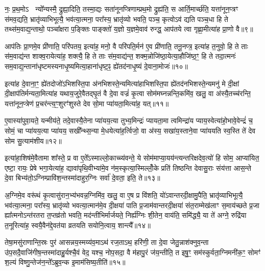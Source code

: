 नः॒ प्र॒थ॒मो\-ऽ  न्यो᳚न्यस्मै॒ द्रुह्या॒दिति॒ तस्मा॒द्यः सता॑नूनप्त्रिणाम्प्रथ॒मो द्रुह्य॑ति॒ स आर्ति॒मार्च्छ॑ति॒ यत्ता॑नून॒प्त्रꣳ स॑मव॒द्यति॒ भ्रातृ॑व्याभिभूत्यै॒ भव॑त्या॒त्मना॒ परा᳚स्य॒ भ्रातृ॑व्यो भवति॒ पञ्च॒ कृत्वो\-ऽव॑ द्यति पञ्च॒धा हि ते तथ्स॑म॒वाद्य॒न्ताथो॒ पञ्चा᳚क्षरा प॒ङ्क्तिः पाङ्क्तो॑ य॒ज्ञो य॒ज्ञमे॒वाव॑ रुन्द्ध॒ आप॑तये त्वा गृह्णा॒मीत्या॑ह प्रा॒णो वै॥९॥

आप॑तिः प्रा॒णमे॒व प्री॑णाति॒ परि॑पतय॒ इत्या॑ह॒ मनो॒ वै परि॑पति॒र्मन॑ ए॒व प्री॑णाति॒ तनू॒नप्त्र॒ इत्या॑ह त॒नुवो॒ हि ते ताः स॑म॒वाद्य॑न्त शाक्व॒रायेत्या॑ह॒ शक्त्यै॒ हि ते ताः स॑म॒वाद्य॑न्त॒ शक्म॒न्नोजि॑ष्ठा॒येत्या॒हौजि॑ष्ठ॒ꣳ॒ हि ते तदा॒त्मनः॑ सम॒वाद्य॒न्ताना॑धृष्टमस्यनाधृ॒ष्यमित्या॒हाना॑धृष्ट॒ꣴ॒ ह्ये॑तद॑नाधृ॒ष्यं दे॒वाना॒मोजः॑॥१०॥

इत्या॑ह दे॒वाना॒ꣳ॒ ह्ये॑तदोजो॑\-ऽभिशस्ति॒पा अ॑नभिशस्ते॒न्यमित्या॑हाभिशस्ति॒पा ह्ये॑तद॑नभिशस्ते॒न्यमनु॑ मे दी॒क्षां दी॒क्षाप॑तिर्मन्यता॒मित्या॑ह यथाय॒जुरे॒वैतद्घृ॒तं वै दे॒वा वज्रं॑ कृ॒त्वा सोम॑मघ्नन्नन्ति॒कमि॑व॒ खलु॒ वा अ॑स्यै॒तच्च॑रन्ति॒ यत्ता॑नून॒प्त्रेण॑ प्र॒चर॑न्त्य॒ꣳ॒शुरꣳ॑शुस्ते देव सो॒मा प्या॑यता॒मित्या॑ह॒ यत्॥११॥

ए॒वास्या॑पुवा॒यते॒ यन्मीय॑ते॒ तदे॒वास्यै॒तेना प्या॑यय॒त्या तुभ्य॒मिन्द्रः॑ प्यायता॒मा त्वमिन्द्रा॑य प्याय॒स्वेत्या॑हो॒भावे॒वेन्द्रं॑ च॒ सोमं॒ चा प्या॑यय॒त्या प्या॑यय॒ सखी᳚न्थ्स॒न्या मे॒धयेत्या॑ह॒र्त्विजो॒ वा अ॑स्य॒ सखा॑य॒स्ताने॒वा प्या॑ययति स्व॒स्ति ते॑ देव सोम सु॒त्याम॑शीय॥१२॥

इत्या॑हा॒शिष॑मे॒वैतामा शा᳚स्ते॒ प्र वा ए॒ते᳚\-ऽस्माल्लो॒काच्च्य॑वन्ते॒ ये सोम॑माप्या॒यय॑न्त्यन्तरिक्षदेव॒त्यो॑ हि सोम॒ आप्या॑यित॒ एष्टा॒ रायः॒ प्रेषे भगा॒येत्या॑ह॒ द्यावा॑पृथि॒वीभ्या॑मे॒व न॑म॒स्कृत्या॒स्मिल्लोँ॒के प्रति॑ तिष्ठन्ति देवासु॒राः संय॑त्ता आस॒न्ते दे॒वा बिभ्य॑तो॒\-ऽग्निम्प्रावि॑श॒न्तस्मा॑दाहुर॒ग्निः सर्वा॑ दे॒वता॒ इति॒ ते॥१३॥

अ॒ग्निमे॒व वरू॑थं कृ॒त्वासु॑रान॒भ्य॑भवन्न॒ग्निमि॑व॒ खलु॒ वा ए॒ष प्र वि॑शति॒ यो॑\-ऽवान्तरदी॒क्षामु॒पैति॒ भ्रातृ॑व्याभिभूत्यै॒ भव॑त्या॒त्मना॒ परा᳚स्य॒ भ्रातृ॑व्यो भवत्या॒त्मान॑मे॒व दी॒क्षया॑ पाति प्र॒जाम॑वान्तरदी॒क्षया॑ संत॒राम्मेख॑लाꣳ स॒माय॑च्छते प्र॒जा ह्या᳚त्मनो\-ऽन्त॑रतरा त॒प्तव्र॑तो भवति॒ मद॑न्तीभिर्मार्जयते॒ निर्\mbox{}ह्य॑ग्निः शी॒तेन॒ वाय॑ति॒ समि॑द्ध्यै॒ या ते॑ अग्ने॒ रुद्रि॑या त॒नूरित्या॑ह॒ स्वयै॒वैन॑द्दे॒वत॑या व्रतयति सयोनि॒त्वाय॒ शान्त्यै᳚॥१४॥

{\anuvakamend[{यो वा ओज॑ आह॒ यद॑शी॒येति॒ ते᳚\-ऽग्न॒ एका॑दश च॥२॥}]}

तेषा॒मसु॑राणान्ति॒स्रः पुर॑ आसन्नय॒स्मय्य॑व॒मा\-ऽथ॑ रज॒ता\-ऽथ॒ हरि॑णी॒ ता दे॒वा जेतु॒न्नाश॑क्नुव॒न्ता उ॑प॒सदै॒वाजि॑गीष॒न्तस्मा॑दाहु॒र्यश्चै॒वं वेद॒ यश्च॒ नोप॒सदा॒ वै म॑हापु॒रं ज॑य॒न्तीति॒ त इषु॒ꣳ॒ सम॑स्कुर्वता॒ग्निमनी॑क॒ꣳ॒ सोमꣳ॑ श॒ल्यं विष्णु॒न्तेज॑न॒न्ते᳚\-ऽब्रुव॒न्क इ॒माम॑सिष्य॒तीति॑॥१५॥


